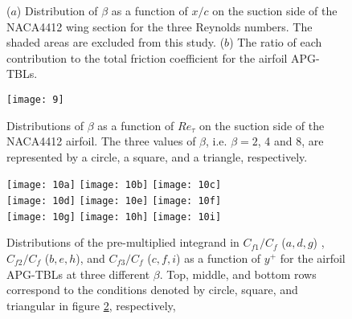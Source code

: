 

\begin{figure}
\subfigure{\texttt{[image: 8a]}\label{evolution:a}}
\subfigure{\texttt{[image: 8b]}\label{evolution:b}}
\caption{($a$) Distribution of $\beta$ as a function of $x/c$ on the suction side of the NACA4412 wing section for the three Reynolds numbers. The shaded areas are excluded from this study. ($b$) The ratio of each contribution to the total friction coefficient for the airfoil APG-TBLs.}
\label{evolution}
\end{figure}

\begin{figure}[h]
\centering
\texttt{[image: 9]}
\caption{Distributions of $\beta$ as a function of $Re_\tau$ on the suction side of the NACA4412 airfoil. The three values of $\beta$, i.e. $\beta=2$, 4 and 8, are represented by a circle, a square, and a triangle, respectively.}
\label{ret_beta}
\end{figure}


\begin{figure}[h]
{\texttt{[image: 10a]}\label{naca:a}}
{\texttt{[image: 10b]}\label{naca:b}}
{\texttt{[image: 10c]}\label{naca:c}} \\
{\texttt{[image: 10d]}\label{naca:d}}
{\texttt{[image: 10e]}\label{naca:e}}  
{\texttt{[image: 10f]}\label{naca:f}} \\
{\texttt{[image: 10g]}\label{naca:g}}
{\texttt{[image: 10h]}\label{naca:h}}
{\texttt{[image: 10i]}\label{naca:i}}
\caption{Distributions of the pre-multiplied integrand in $C_{f1}/C_f$ ($a, d, g$) , $C_{f2}/C_f$ ($b, e, h$), and $C_{f3}/C_f$ ($c, f, i$) as a function of $y^+$ for the airfoil APG-TBLs at three different $\beta$. Top, middle, and bottom rows correspond to the conditions denoted by circle, square, and triangular in figure \ref{ret_beta}, respectively,}
\label{naca}
\end{figure}



